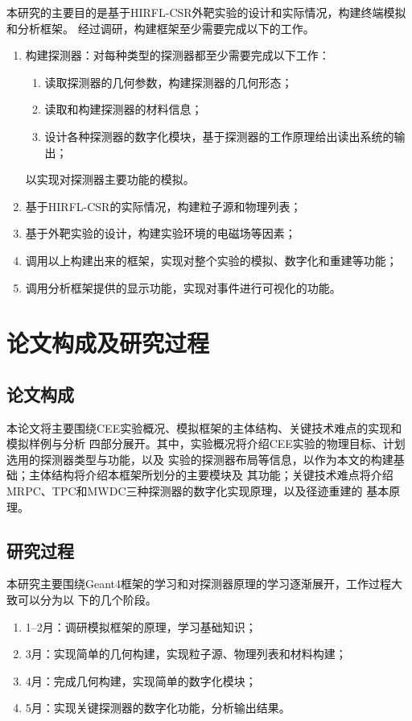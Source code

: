\documentclass[bachelor,openany,oneside,color]{buaathesis}
\begin{document}
本研究的主要目的是基于HIRFL-CSR外靶实验的设计和实际情况，构建终端模拟和分析框架。
经过调研，构建框架至少需要完成以下的工作。
\begin{enumerate}
	\item 构建探测器：对每种类型的探测器都至少需要完成以下工作：
	\begin{enumerate}
		\item 读取探测器的几何参数，构建探测器的几何形态；
		\item 读取和构建探测器的材料信息；
		\item 设计各种探测器的数字化模块，基于探测器的工作原理给出读出系统的输出；
	\end{enumerate}
		以实现对探测器主要功能的模拟。
	\item 基于HIRFL-CSR的实际情况，构建粒子源和物理列表；
	\item 基于外靶实验的设计，构建实验环境的电磁场等因素；
	\item 调用以上构建出来的框架，实现对整个实验的模拟、数字化和重建等功能；
	\item 调用分析框架提供的显示功能，实现对事件进行可视化的功能。
\end{enumerate}

\section{论文构成及研究过程}

\subsection{论文构成}

本论文将主要围绕CEE实验概况、模拟框架的主体结构、关键技术难点的实现和模拟样例与分析
四部分展开。其中，实验概况将介绍CEE实验的物理目标、计划选用的探测器类型与功能，以及
实验的探测器布局等信息，以作为本文的构建基础；主体结构将介绍本框架所划分的主要模块及
其功能；关键技术难点将介绍MRPC、TPC和MWDC三种探测器的数字化实现原理，以及径迹重建的
基本原理。

\subsection{研究过程}

本研究主要围绕Geant4框架的学习和对探测器原理的学习逐渐展开，工作过程大致可以分为以
下的几个阶段。
\begin{enumerate}
	\item 1--2月：调研模拟框架的原理，学习基础知识；
	\item 3月：实现简单的几何构建，实现粒子源、物理列表和材料构建；
	\item 4月：完成几何构建，实现简单的数字化模块；
	\item 5月：实现关键探测器的数字化功能，分析输出结果。
\end{enumerate}
\end{document}
